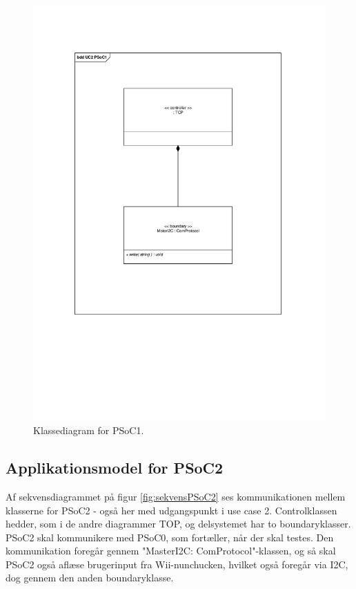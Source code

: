 \begin{figure}[H]
	\centering
	\includegraphics[trim = {1cm 7.6cm 1.8cm 3.4cm}, clip = true, width=\textwidth] {Systemarkitektur/images/klassediagramPSoC1.pdf}
	\caption{Klassediagram for PSoC1.}
	\label{fig:klassePSoC1}
\end{figure}

\subsection{Applikationsmodel for PSoC2}
Af sekvensdiagrammet på figur \ref{fig:sekvensPSoC2} ses kommunikationen mellem klasserne for PSoC2 - også her med udgangspunkt i use case 2. Controlklassen hedder, som i de andre diagrammer TOP, og delsystemet har to boundaryklasser. PSoC2 skal kommunikere med PSoC0, som fortæller, når der skal testes. Den kommunikation foregår gennem "MasterI2C: ComProtocol"-klassen, og så skal PSoC2 også aflæse brugerinput fra Wii-nunchucken, hvilket også foregår via I2C, dog gennem den anden boundaryklasse.

